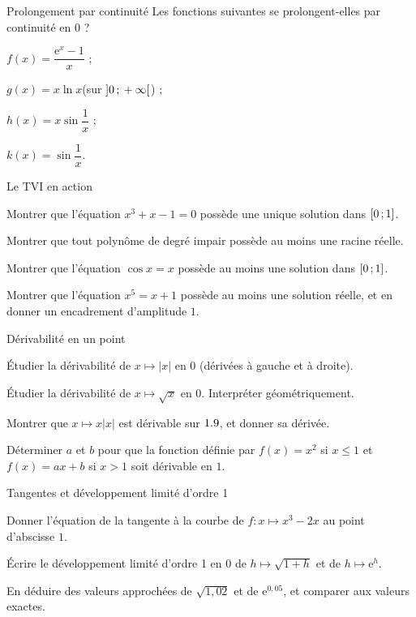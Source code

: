 \begin{exercice}[1]{Prolongement par continuité}
Les fonctions suivantes se prolongent-elles par continuité en $0$ ?
\begin{questions}
  \item $f(x)=\dfrac{\mathrm{e}^{x}-1}{x}$ ;
  \item $g(x)=x\ln x$\quad(sur $\mathopen{]}0\,{;}\,+\infty\mathclose{[}$) ;
  \item $h(x)=x\sin\dfrac1x$ ;
  \item $k(x)=\sin\dfrac1x$.
\end{questions}
\end{exercice}

\begin{exercice}[1]{Le TVI en action}
\begin{questions}
  \item Montrer que l'équation $x^{3}+x-1=0$ possède une unique solution
    dans $\mathopen{[}0\,{;}\,1\mathclose{]}$.
  \item Montrer que tout polynôme de degré impair possède au moins une
    racine réelle.
  \item Montrer que l'équation $\cos x=x$ possède au moins une solution
    dans $\mathopen{[}0\,{;}\,1\mathclose{]}$.
  \item Montrer que l'équation $x^{5}=x+1$ possède au moins une solution
    réelle, et en donner un encadrement d'amplitude $1$.
\end{questions}
\end{exercice}

\begin{exercice}[1]{Dérivabilité en un point}
\begin{questions}
  \item Étudier la dérivabilité de $x\mapsto|x|$ en $0$ (dérivées à gauche
    et à droite).
  \item Étudier la dérivabilité de $x\mapsto\sqrt{x}$ en $0$. Interpréter
    géométriquement.
  \item Montrer que $x\mapsto x|x|$ est dérivable sur $1.9$, et donner sa
    dérivée.
  \item Déterminer $a$ et $b$ pour que la fonction définie par
    $f(x)=x^{2}$ si $x\leq1$ et $f(x)=ax+b$ si $x>1$ soit dérivable en $1$.
\end{questions}
\end{exercice}

\begin{exercice}[1]{Tangentes et développement limité d'ordre 1}
\begin{questions}
  \item Donner l'équation de la tangente à la courbe de
    $f:x\mapsto x^{3}-2x$ au point d'abscisse $1$.
  \item Écrire le développement limité d'ordre 1 en $0$ de
    $h\mapsto\sqrt{1+h}$ et de $h\mapsto\mathrm{e}^{h}$.
  \item En déduire des valeurs approchées de $\sqrt{1{,}02}$ et de
    $\mathrm{e}^{0{,}05}$, et comparer aux valeurs exactes.
\end{questions}
\end{exercice}

